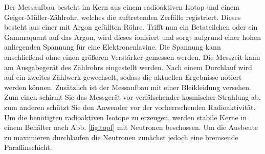 Der Messaufbau besteht im Kern aus einem radioaktiven Isotop und einem
 Geiger-Müller-Zählrohr, welches die auftretenden Zerfälle registriert. Dieses besteht aus einer mit Argon gefüllten Röhre. Trifft nun ein Betateilchen oder ein Gammaquant auf das Argon, wird dieses ionisiert und sorgt aufgrund einer hohen anliegenden Spannung für eine Elektronenlavine. Die Spannung kann anschließend ohne einen größeren Verstärker gemessen werden. Die Messzeit kann am Ausgabegerät des Zählrohrs eingestellt werden. Nach einem Durchlauf wird auf ein zweites Zählwerk gewechselt, sodass die aktuellen Ergebnisse notiert werden können. Zusätzlich ist der Messaufbau mit einer Bleikleidung versehen. Zum einen schirmt Sie das Messgerät vor verfälschender kosmischer Strahlung ab, zum anderen schützt Sie den Anwender vor der vorherrschenden Radioaktivität. Um die benötigten radioaktiven Isotope zu erzeugen, werden stabile Kerne in einem Behälter nach Abb. \ref{fig:topf} mit Neutronen beschossen. Um die Ausbeute zu maximieren durchlaufen die Neutronen zunächst jedoch eine bremsende Paraffinschicht.
